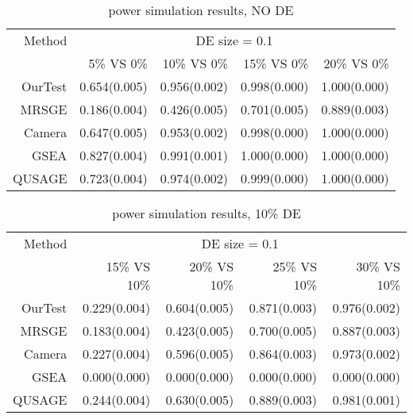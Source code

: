 \documentclass[11pt, a4paper]{article}
\begin{document}
		  		
	\begin{table}[ht]
		\centering
			\caption{power simulation results, NO DE}\label{table:power1}
		\begin{tabular}{rrrrr}
			\hline
		
		Method & \multicolumn{4}{c}{DE size = 0.1} \\
			\cline{2-5}
			& 5\% VS 0\% & 10\% VS 0\% & 15\% VS 0\% & 20\% VS 0\% \\ 
			\hline 
			OurTest & 0.654(0.005) & 0.956(0.002) & 0.998(0.000) & 1.000(0.000) \\ 
			MRSGE & 0.186(0.004) & 0.426(0.005) & 0.701(0.005) & 0.889(0.003) \\ 
			Camera & 0.647(0.005) & 0.953(0.002) & 0.998(0.000) & 1.000(0.000) \\ 
			GSEA & 0.827(0.004) & 0.991(0.001) & 1.000(0.000) & 1.000(0.000) \\ 
			QUSAGE & 0.723(0.004) & 0.974(0.002) & 0.999(0.000) & 1.000(0.000) \\ 
			\hline 
		\end{tabular}
	\end{table}
	
	
	\begin{table}[ht]
		\centering
	    \caption{power simulation results, 10\% DE }\label{table:power2}
		\begin{tabular}{rrrrr}
			\hline
		Method & \multicolumn{4}{c}{DE size = 0.1} \\
			\cline{2-5}
			& 15\% VS 10\% & 20\% VS 10\% & 25\% VS 10\% & 30\% VS 10\% \\ 
			\hline
		OurTest & 0.229(0.004) & 0.604(0.005) & 0.871(0.003) & 0.976(0.002) \\ 
		MRSGE & 0.183(0.004) & 0.423(0.005) & 0.700(0.005) & 0.887(0.003) \\ 
		Camera & 0.227(0.004) & 0.596(0.005) & 0.864(0.003) & 0.973(0.002) \\ 
		GSEA & 0.000(0.000) & 0.000(0.000) & 0.000(0.000) & 0.000(0.000) \\ 
		QUSAGE & 0.244(0.004) & 0.630(0.005) & 0.889(0.003) & 0.981(0.001) \\ 
		\hline
		\end{tabular}
	\end{table}
	
\end{document}

